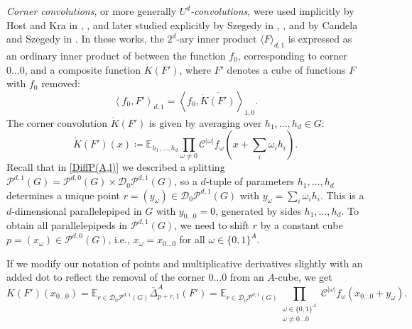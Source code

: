 \documentclass{amsart}
\theoremstyle{definition}
\theoremstyle{remark}
\numberwithin{equation}{section}
\begin{document}

 {\it Corner convolutions}, or more generally {\it $U^d$-convolutions}, were used implicitly by Host and Kra in \cite{HoKr04}, \cite{HoKr05},  and later studied explicitly by Szegedy in \cite{Szeg10d}, \cite{Szeg12}, and by Candela and Szegedy in \cite{CanSze18}. In these works,  the $2^d$-ary inner product $\langle F \rangle_{d,1}$ is expressed as an ordinary inner product of between the function $f_0$, corresponding to corner $0\dots 0$,  and a composite  function $\dot{K}(F')$, where $F'$ denotes a cube of functions $F$ with $f_0$ removed:
$$ \left\langle f_0, F' \right\rangle_{d,1}  = \left\langle f_0, \overline{\dot{K}(F')} \right\rangle_{1,0}.$$
The corner convolution $\dot{K}(F')$ is given by averaging over $h_1, \dots , h_d \in G$:
$$ \dot{K}(F')(x) \coloneqq \mathbb{E}_{h_1, \dots , h_d} \prod_{\omega \neq 0} \mathcal{C^{|\omega|}}f_\omega(x + \sum_i \omega_i h_i) .$$
Recall that in \eqref{DiffP(A,l)} we described a splitting $\mathcal{P}^{d,1}(G) = \mathcal{P}^{d,0}(G) \times \mathcal{D_0}\mathcal{P}^{d,1}(G)$, so  a $d$-tuple of parameters $h_1, \dots, h_d$ determines a unique point $r = (y_\omega) \in \mathcal{D}_0\mathcal{P}^{d,1}(G)$ with $y_\omega = \sum_i \omega_i h_i$. This is a $d$-dimensional parallelepiped in $G$ with $y_{0\dots 0} = 0$, generated by sides $h_1, \dots, h_d$. To obtain all parallelepipeds in $\mathcal{P}^{d,1}(G)$, we need to shift $r$ by a constant cube $p=(x_\omega)\in \mathcal{P}^{d,0}(G)$, i.e.,
$x_\omega = x_{0\dots0}$ for all $\omega \in \{0,1\}^A$.


If we modify our notation of points and multiplicative derivatives slightly with an added dot to reflect the removal of the corner $0 \dots 0$ from an $A$-cube, we get
$$ \dot{K}(F')(x_{0\dots0}) = \mathbb{E}_{r \in  \mathcal{D}_0\mathcal{P}^{d,1}(G)} \overline{\Delta}^A_{\dot{p}+\dot{r},1} (F') = \mathbb{E}_{r \in  \mathcal{D}_0\mathcal{P}^{d,1}(G)} \prod_{\substack{\omega \in \{0,1\}^A\\ \omega \neq  0\dots0 }} \mathcal{C}^{|\omega|} f_\omega (x_{0\dots0} + y_\omega).$$
\end{document}
